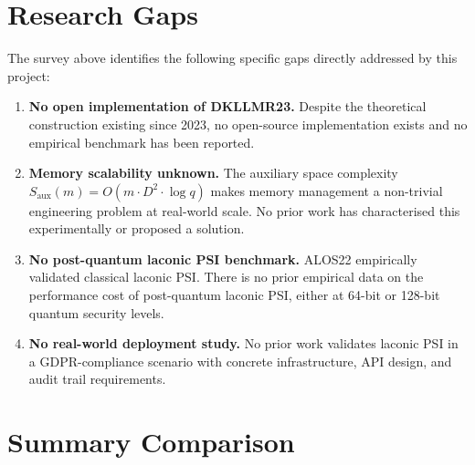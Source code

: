 \section{Research Gaps}

The survey above identifies the following specific gaps directly addressed by this project:

\begin{enumerate}
    \item \textbf{No open implementation of DKLLMR23.} Despite the theoretical
          construction existing since 2023, no open-source implementation exists
          and no empirical benchmark has been reported.
    \item \textbf{Memory scalability unknown.} The auxiliary space complexity
          $S_{\text{aux}}(m) = O(m \cdot D^2 \cdot \log q)$ makes memory management
          a non-trivial engineering problem at real-world scale. No prior work has
          characterised this experimentally or proposed a solution.
    \item \textbf{No post-quantum laconic PSI benchmark.} ALOS22 empirically
          validated classical laconic PSI. There is no prior empirical data on
          the performance cost of post-quantum laconic PSI, either at 64-bit or
          128-bit quantum security levels.
    \item \textbf{No real-world deployment study.} No prior work validates laconic
          PSI in a GDPR-compliance scenario with concrete infrastructure, API design,
          and audit trail requirements.
\end{enumerate}

\section{Summary Comparison}


